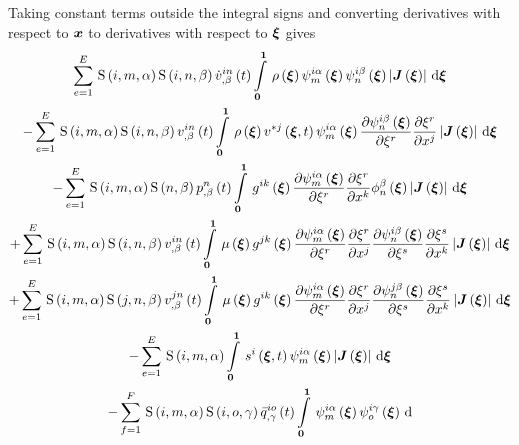 Taking constant terms outside the integral signs and converting derivatives
with respect to $ \boldsymbol{x} $ to derivatives with respect to $ \boldsymbol{\xi} $ gives
\begin{multline}
  \gsum{e=1}{E}{\idxgsf{i}{m}{\alpha}\idxgsf{i}{n}{\beta}\fnof{\idxnodedof{\dot{v}}{i}{n}{\beta}}{t}
    \gint{\vectr{0}}{\vectr{1}}{\fnof{\rho}{\vectr{\xi}}
      \idxgbfn{i}{m}{\alpha}{\vectr{\xi}}\idxgbfn{i}{n}{\beta}{\vectr{\xi}}
      \abs{\fnof{\matr{J}}{\vectr{\xi}}}}{\vectr{\xi}}}\\
  -\gsum{e=1}{E}{\idxgsf{i}{m}{\alpha}\idxgsf{i}{n}{\beta}\fnof{\idxnodedof{v}{i}{n}{\beta}}{t}
    \gint{\vectr{0}}{\vectr{1}}{\fnof{\rho}{\vectr{\xi}}\fnof{v^{*j}}{\vectr{\xi},t}
      \idxgbfn{i}{m}{\alpha}{\vectr{\xi}}\delby{\idxgbfn{i}{n}{\beta}{\vectr{\xi}}}{\xi^{r}}
      \delby{\xi^{r}}{x^{j}}\abs{\fnof{\matr{J}}{\vectr{\xi}}}}{\vectr{\xi}}}\\
  -\gsum{e=1}{E}{\idxgsf{i}{m}{\alpha}\gsf{n}{\beta}\fnof{\nodedof{p}{n}{\beta}}{t}\gint{\vectr{0}}{\vectr{1}}{
      \fnof{g^{ik}}{\vectr{\xi}}\delby{\idxgbfn{i}{m}{\alpha}{\vectr{\xi}}}{\xi^{r}}\delby{\xi^{r}}{x^{k}}
      \altgbfn{n}{\beta}{\vectr{\xi}}\abs{\fnof{\matr{J}}{\vectr{\xi}}}}{\vectr{\xi}}}\\
  +\gsum{e=1}{E}{\idxgsf{i}{m}{\alpha}\idxgsf{i}{n}{\beta}\fnof{\idxnodedof{v}{i}{n}{\beta}}{t}\gint{\vectr{0}}{\vectr{1}}{
      \fnof{\mu}{\vectr{\xi}}\fnof{g^{jk}}{\vectr{\xi}}\delby{\idxgbfn{i}{m}{\alpha}{\vectr{\xi}}}{\xi^{r}}
      \delby{\xi^{r}}{x^{j}}\delby{\idxgbfn{i}{n}{\beta}{\vectr{\xi}}}{\xi^{s}}\delby{\xi^{s}}{x^{k}}
      \abs{\fnof{\matr{J}}{\vectr{\xi}}}}{\vectr{\xi}}}\\
  +\gsum{e=1}{E}{\idxgsf{i}{m}{\alpha}\idxgsf{j}{n}{\beta}\fnof{\idxnodedof{v}{j}{n}{\beta}}{t}
    \gint{\vectr{0}}{\vectr{1}}{\fnof{\mu}{\vectr{\xi}}\fnof{g^{ik}}{\vectr{\xi}}\delby{\idxgbfn{i}{m}{\alpha}{\vectr{\xi}}}{\xi^{r}}
      \delby{\xi^{r}}{x^{j}}\delby{\idxgbfn{j}{n}{\beta}{\vectr{\xi}}}{\xi^{s}}\delby{\xi^{s}}{x^{k}}
      \abs{\fnof{\matr{J}}{\vectr{\xi}}}}{\vectr{\xi}}} \\
  -\gsum{e=1}{E}{\idxgsf{i}{m}{\alpha}\gint{\vectr{0}}{\vectr{1}}{\fnof{s^{i}}{\vectr{\xi},t}
      \idxgbfn{i}{m}{\alpha}{\vectr{\xi}}\abs{\fnof{\matr{J}}{\vectr{\xi}}}}{\vectr{\xi}}}\\
  -\gsum{f=1}{F}{\idxgsf{i}{m}{\alpha}\idxgsf{i}{o}{\gamma}\fnof{\idxnodedof{\bar{q}}{i}{o}{\gamma}}{t}
    \gint{\vectr{0}}{\vectr{1}}{\idxgbfn{i}{m}{\alpha}{\vectr{\xi}}\idxgbfn{i}{o}{\gamma}{\vectr{\xi}}
}}
\end{multline}
